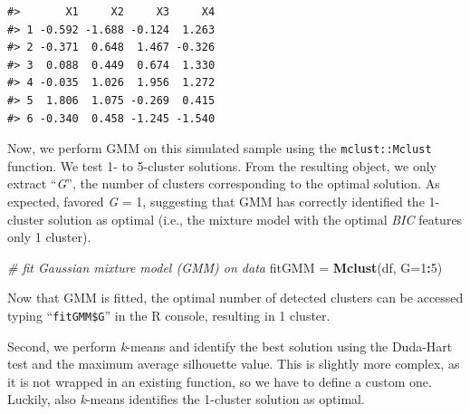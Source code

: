 \documentclass[
  man,floatsintext]{apa6}
\newenvironment{Shaded}{\begin{snugshade}}{\end{snugshade}}
\newcommand{\AttributeTok}[1]{\textcolor[rgb]{0.13,0.29,0.53}{#1}}
\newcommand{\CommentTok}[1]{\textcolor[rgb]{0.56,0.35,0.01}{\textit{#1}}}
\newcommand{\DecValTok}[1]{\textcolor[rgb]{0.00,0.00,0.81}{#1}}
\newcommand{\FunctionTok}[1]{\textcolor[rgb]{0.13,0.29,0.53}{\textbf{#1}}}
\newcommand{\NormalTok}[1]{#1}
\newcommand{\OtherTok}[1]{\textcolor[rgb]{0.56,0.35,0.01}{#1}}
\newcommand{\SpecialCharTok}[1]{\textcolor[rgb]{0.81,0.36,0.00}{\textbf{#1}}}
\begin{document}
\begin{verbatim}
#>       X1     X2     X3     X4
#> 1 -0.592 -1.688 -0.124  1.263
#> 2 -0.371  0.648  1.467 -0.326
#> 3  0.088  0.449  0.674  1.330
#> 4 -0.035  1.026  1.956  1.272
#> 5  1.806  1.075 -0.269  0.415
#> 6 -0.340  0.458 -1.245 -1.540
\end{verbatim}

Now, we perform GMM on this simulated sample using the \texttt{mclust::Mclust} function. We test 1- to 5-cluster solutions. From the resulting object, we only extract ``\emph{G}'', the number of clusters corresponding to the optimal solution. As expected, favored \emph{G} = 1, suggesting that GMM has correctly identified the 1-cluster solution as optimal (i.e., the mixture model with the optimal \emph{BIC} features only 1 cluster).

\begin{Shaded}
\begin{Highlighting}[]
\CommentTok{\# fit Gaussian mixture model (GMM) on data}
\NormalTok{fitGMM }\OtherTok{=} \FunctionTok{Mclust}\NormalTok{(df, }\AttributeTok{G=}\DecValTok{1}\SpecialCharTok{:}\DecValTok{5}\NormalTok{)}
\end{Highlighting}
\end{Shaded}

Now that GMM is fitted, the optimal number of detected clusters can be accessed typing ``\texttt{fitGMM\$G}'' in the R console, resulting in 1 cluster.

Second, we perform \emph{k}-means and identify the best solution using the Duda-Hart test and the maximum average silhouette value. This is slightly more complex, as it is not wrapped in an existing function, so we have to define a custom one. Luckily, also \emph{k}-means identifies the 1-cluster solution as optimal.
\end{document}
